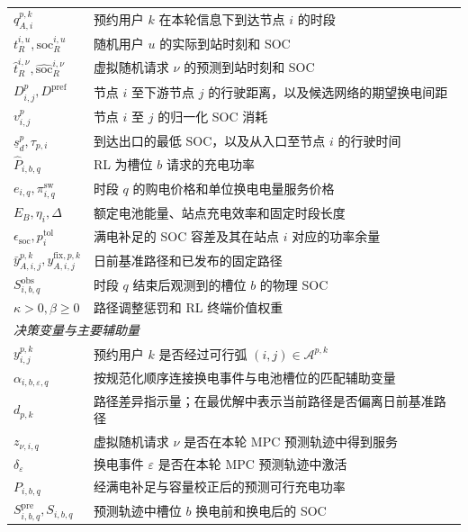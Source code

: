 \documentclass[12pt,a4paper,UTF8]{ctexart}
\begin{document}
\begin{table}[!htbp]
\begin{tabular}{@{}lp{13cm}@{}}
    $q_{A,i}^{p,k}$ & 预约用户 $k$ 在本轮信息下到达节点 $i$ 的时段 \\
    $t_R^{i,u},\mathrm{soc}_R^{i,u}$ & 随机用户 $u$ 的实际到站时刻和 SOC \\
    $\widehat t_{R}^{i,\nu},\widehat{\mathrm{soc}}_{R}^{i,\nu}$ & 虚拟随机请求 $\nu$ 的预测到站时刻和 SOC \\
    $D_{i,j}^{p},D^{\mathrm{pref}}$ & 节点 $i$ 至下游节点 $j$ 的行驶距离，以及候选网络的期望换电间距 \\
    $v^{p}_{i,j}$ & 节点 $i$ 至 $j$ 的归一化 SOC 消耗 \\
    $\underline s_d^p,\tau_{p,i}$ & 到达出口的最低 SOC，以及从入口至节点 $i$ 的行驶时间 \\
    $\widehat P_{i,b,q}$ & RL 为槽位 $b$ 请求的充电功率 \\
    $e_{i,q},\pi_{i,q}^{\mathrm{sw}}$ & 时段 $q$ 的购电价格和单位换电电量服务价格 \\
    $E_B,\eta_i,\Delta$ & 额定电池能量、站点充电效率和固定时段长度 \\
    $\epsilon_{\mathrm{soc}},p_i^{\mathrm{tol}}$ & 满电补足的 SOC 容差及其在站点 $i$ 对应的功率余量 \\
    $\bar y_{A,i,j}^{p,k},y_{A,i,j}^{\mathrm{fix},p,k}$ & 日前基准路径和已发布的固定路径 \\
    $S_{i,b,q}^{\mathrm{obs}}$ & 时段 $q$ 结束后观测到的槽位 $b$ 的物理 SOC \\
    $\kappa>0,\beta\ge0$ & 路径调整惩罚和 RL 终端价值权重 \\
    \midrule
    \multicolumn{2}{l}{\textit{决策变量与主要辅助量}} \\
    $y_{i,j}^{p,k}$ & 预约用户 $k$ 是否经过可行弧 $(i,j)\in\mathcal A^{p,k}$ \\
    $\alpha_{i,b,\varepsilon,q}$ & 按规范化顺序连接换电事件与电池槽位的匹配辅助变量 \\
    $d_{p,k}$ & 路径差异指示量；在最优解中表示当前路径是否偏离日前基准路径 \\
    $z_{\nu,i,q}$ & 虚拟随机请求 $\nu$ 是否在本轮 MPC 预测轨迹中得到服务 \\
    $\delta_\varepsilon$ & 换电事件 $\varepsilon$ 是否在本轮 MPC 预测轨迹中激活 \\
    $P_{i,b,q}$ & 经满电补足与容量校正后的预测可行充电功率 \\
    $S_{i,b,q}^{\mathrm{pre}},S_{i,b,q}$ & 预测轨迹中槽位 $b$ 换电前和换电后的 SOC \\
    \bottomrule
  \end{tabular}
\end{table}
\end{document}
